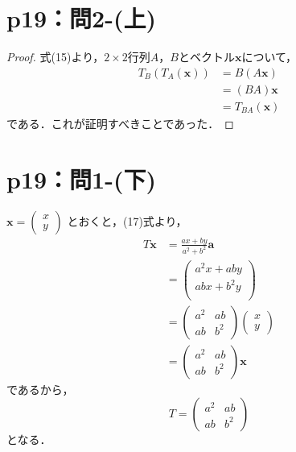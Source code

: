 \documentclass[a4paper,10pt,fleqn]{ltjsarticle}
\begin{document}
\section*{p19：問2-(上)}
\begin{tleftbar}
    \begin{proof}
        式(15)より，$2 \times 2$行列$A$，$B$とベクトル$\bm{x}$について，
        \begin{align*}
            T_B (T_A (\bm{x})) & = B(A\bm{x})      \\
                               & = (BA) \bm{x}     \\
                               & = T_{BA} (\bm{x})
        \end{align*}
        である．これが証明すべきことであった．
    \end{proof}
\end{tleftbar}


\section*{p19：問1-(下)}

\begin{tleftbar}
    $\bm{x} =
        \begin{pmatrix}
            x \\
            y
        \end{pmatrix}
    $
    とおくと，(17)式より，
    \begin{align*}
        T \bm{x} & = \frac{ax+by}{a^2+b^2} \bm{a} \\
                 & =
        \begin{pmatrix}
            a^2x +aby   \\
            ab x + b^2y \\
        \end{pmatrix}
        \\
                 & =
        \begin{pmatrix}
            a^2 & ab  \\
            ab  & b^2
        \end{pmatrix}
        \begin{pmatrix}
            x \\
            y
        \end{pmatrix}
        \\
                 & =
        \begin{pmatrix}
            a^2 & ab  \\
            ab  & b^2
        \end{pmatrix}
        \bm{x}
    \end{align*}
    であるから，
    \[
        T=\begin{pmatrix}
            a^2 & ab  \\
            ab  & b^2
        \end{pmatrix}
    \]
    となる．
\end{tleftbar}
%
\newpage
\end{document}
